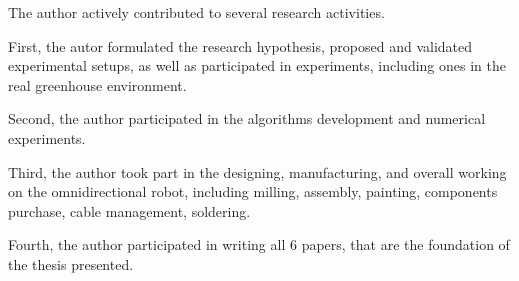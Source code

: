 









The author actively contributed to several research activities.

First, the autor formulated the research hypothesis, proposed and validated experimental setups, as well as participated in experiments, including ones in the real greenhouse environment.

Second, the author participated in the algorithms development and numerical experiments.

Third, the author took part in the designing, manufacturing, and overall working on the omnidirectional robot, including milling, assembly, painting, components purchase, cable management, soldering.

Fourth, the author participated in writing all 6 papers, that are the foundation of the thesis presented.

